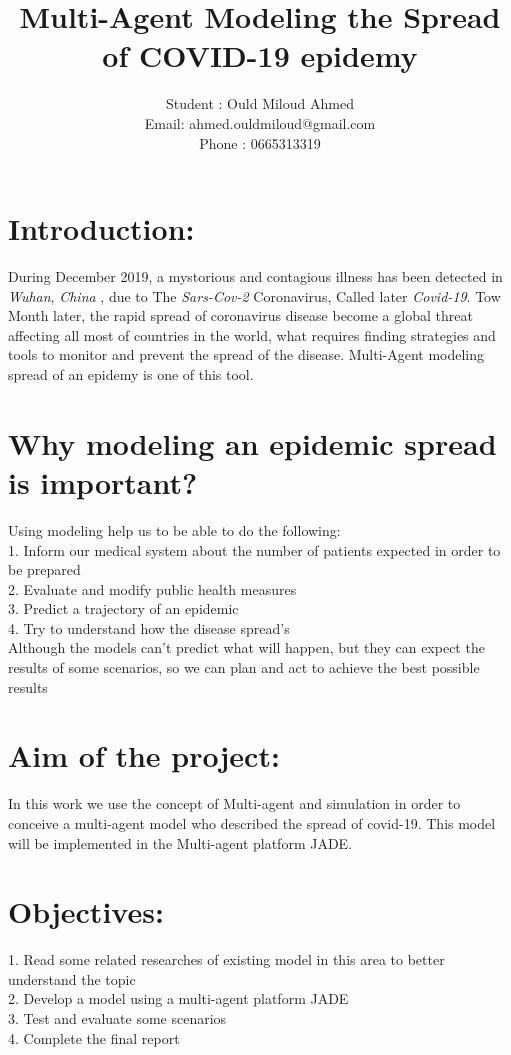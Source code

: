 \documentclass[12pt]{article} %
\title{\textbf{Multi-Agent Modeling the Spread of COVID-19 epidemy}}
\author{Student : Ould Miloud Ahmed\\Email: ahmed.ouldmiloud@gmail.com\\Phone : 0665313319}
\begin{document}
\maketitle
\section{Introduction: }
\hspace{5mm} During December 2019, a mystorious and contagious illness has been detected in \emph{Wuhan},\emph{ China }, due to The \emph{Sars-Cov-2} Coronavirus, Called later \emph {Covid-19}. Tow Month later, the rapid spread of coronavirus disease become a global threat affecting all most of countries in the world, what requires finding strategies and tools to monitor and prevent the spread of the disease. Multi-Agent modeling spread of an epidemy is one of this tool. 
\section{Why modeling an epidemic spread is important? }
\hspace{5mm}Using modeling help us to be able to do the following:\\1.	Inform our medical system about the number of patients expected in order to be prepared\\2.	Evaluate and modify public health measures \\3.	Predict a trajectory of an epidemic\\
4.	Try to understand how the disease spread’s\\

Although the models can’t predict what will happen, but they can expect the results of some scenarios, so we can plan and act to achieve the best possible results 


\section{Aim of the project: }
\hspace{5mm}In this work we use the concept of Multi-agent and simulation in order to conceive a multi-agent model who described the spread of covid-19. This model will be implemented in the Multi-agent platform JADE.
\section{Objectives: }
1.	Read some related researches of existing model in this area to better understand the topic\\
2.	Develop a model using a multi-agent platform JADE\\
3.	Test and evaluate some scenarios\\
4.	Complete the final report
\end{document}
